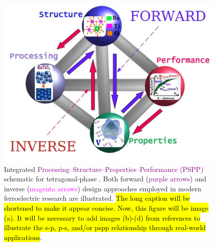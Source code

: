 \documentclass[a4paper,fleqn]{cas-sc}
\begin{document}
\begin{figure}
    \centering
    \includegraphics[width=0.975\linewidth]{figures/Psp_Schematic} 
    \caption{Integrated \textcolor{purple}{Processing--Structure--Properties--Performance (PSPP)} schematic for tetragonal-phase . Both forward (\textcolor{purple}{purple arrows}) and inverse (\textcolor{magenta}{magenta arrows}) design approaches employed in modern ferroelectric research are illustrated.  \hl{The long caption will be shortened to make it appear concise. Now, this figure will be image (a). It will be necessary to add images (b)-(d) from references to illustrate the s-p, p-s, and/or pspp relationship through real-world applications}.}
\label{fig:pspp}
\end{figure}


    
   

\end{document}
